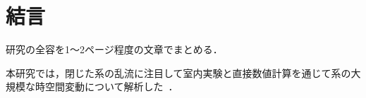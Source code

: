 \chapter{結言}
\label{chap:Summary}

研究の全容を1〜2ページ程度の文章でまとめる．

本研究では，閉じた系の乱流に注目して室内実験と直接数値計算を通じて系の大規模な時空間変動について解析した~\cite{Araki_master_thesis}．

\textcolor{LightGray}{
}
